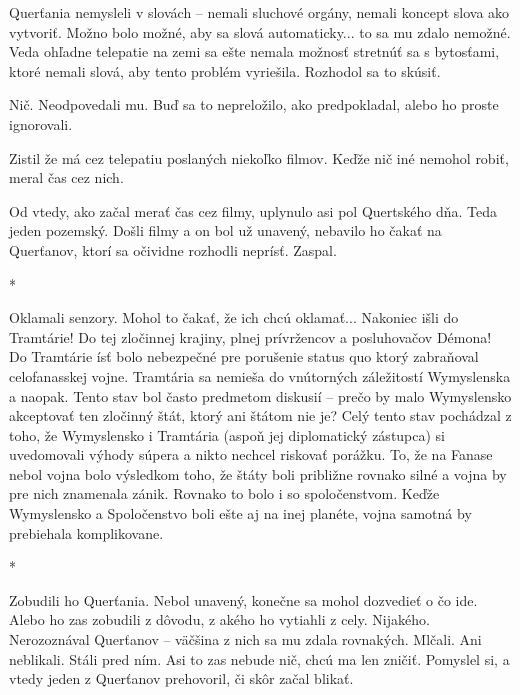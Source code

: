\documentclass{book}
\begin{document}
Querťania nemysleli v slovách – nemali sluchové orgány, nemali koncept slova ako vytvoriť. Možno bolo možné, aby sa slová automaticky... to sa mu zdalo nemožné. Veda ohľadne telepatie na zemi sa ešte nemala možnosť stretnúť sa s bytosťami, ktoré nemali slová, aby tento problém vyriešila. Rozhodol sa to skúsiť.

Nič. Neodpovedali mu. Buď sa to nepreložilo, ako predpokladal, alebo ho proste ignorovali.

Zistil že má cez telepatiu poslaných niekoľko filmov. Keďže nič iné nemohol robiť, meral čas cez nich.

Od vtedy, ako začal merať čas cez filmy, uplynulo asi pol Quertského dňa. Teda jeden pozemský. Došli filmy a on bol už unavený, nebavilo ho čakať na Querťanov, ktorí sa očividne rozhodli neprísť. Zaspal.

\begin{center}

*

\end{center}

Oklamali senzory. Mohol to čakať, že ich chcú oklamať... Nakoniec išli do Tramtárie! Do tej zločinnej krajiny, plnej prívržencov a posluhovačov Démona! Do Tramtárie ísť bolo nebezpečné pre porušenie status quo ktorý zabraňoval celofanasskej vojne. Tramtária sa nemieša do vnútorných záležitostí Wymyslenska a naopak. Tento stav bol často predmetom diskusií – prečo by malo Wymyslensko akceptovať ten zločinný štát, ktorý ani štátom nie je? Celý tento stav pochádzal z toho, že Wymyslensko i Tramtária (aspoň jej diplomatický zástupca) si uvedomovali výhody súpera a nikto nechcel riskovať porážku. To, že na Fanase nebol vojna bolo výsledkom toho, že štáty boli približne rovnako silné a vojna by pre nich znamenala zánik. Rovnako to bolo i so spoločenstvom. Keďže Wymyslensko a Spoločenstvo boli ešte aj na inej planéte, vojna samotná by prebiehala komplikovane.

\begin{center}

*

\end{center}

Zobudili ho Querťania. Nebol unavený, konečne sa mohol dozvedieť o čo ide. Alebo ho zas zobudili z dôvodu, z akého ho vytiahli z cely. Nijakého. Nerozoznával Querťanov – väčšina z nich sa mu zdala rovnakých. Mlčali. Ani neblikali. Stáli pred ním. Asi to zas nebude nič, chcú ma len zničiť. Pomyslel si, a vtedy jeden z Querťanov prehovoril, či skôr začal blikať.
\end{document}
